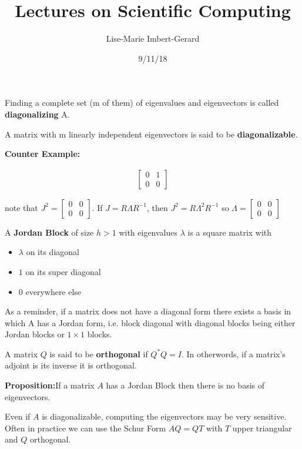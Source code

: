 \documentclass{article}
\title{Lectures on Scientific Computing}
\date{9/11/18}
\author{Lise-Marie Imbert-Gerard}
\newcommand{\n}{\newline}
\begin{document}
	\maketitle
	
	\begin{flushleft}
	Finding a complete set (m of them) of eigenvalues and eigenvectors is called \textbf{diagonalizing} A.\n
	
	A matrix with m linearly independent eigenvectors is said to be \textbf{diagonalizable}.\n
	
	\textbf{Counter Example: \n}
	
	\begin{align*}
		\begin{bmatrix}
		0&1\\
		0&0
		\end{bmatrix}
	\end{align*}
	
	note that $J^{2}=\begin{bmatrix}
	0&0\\
	0&0
	\end{bmatrix}$.  If $J=R\Lambda R^{-1}$, then $J^{2}=R\Lambda^{2}R^{-1}$ so $\Lambda=\begin{bmatrix}
	0&0\\
	0&0
	\end{bmatrix}$\n
	
	A \textbf{Jordan Block} of size $h>1$ with eigenvalues $\lambda$ is a square matrix with 
	
	\begin{itemize}
		\item $\lambda$ on its diagonal\\
		\item $1$ on its super diagonal\\
		\item $0$ everywhere else
	\end{itemize}
	
	As a reminder, if a matrix does not have a diagonal form there exists a basis in which A has a Jordan form, i.e. block diagonal with diagonal blocks being either Jordan blocks or $1\times 1$ blocks.\n
	
	A matrix $Q$ is said to be \textbf{orthogonal} if $Q^{*}Q=I$.  In otherwords, if a matrix's adjoint is its inverse it is orthogonal.\n
	
	\textbf{Proposition:\n}If a matrix $A$ has a Jordan Block then there is no basis of eigenvectors.   \n
	
	Even if $A$ is diagonalizable, computing the eigenvectors may be very sensitive.  Often in practice we can use the Schur Form $AQ=QT$ with $T$ upper triangular and $Q$ orthogonal.\n
	

\end{flushleft}
\end{document}
